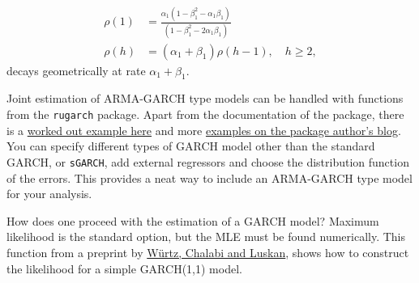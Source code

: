 \documentclass[]{book}
\begin{document}
\[
\begin{align}
  \rho(1) &= \frac{\alpha_1(1-\beta_1^2-\alpha_1\beta_1)}{(1-\beta_1^2-2\alpha_1\beta_1)} \\
  \rho(h) &= (\alpha_1+\beta_1)\rho(h-1), \quad h \geq 2,
\end{align}
\] decays geometrically at rate \(\alpha_1+\beta_1\).

Joint estimation of ARMA-GARCH type models can be handled with functions
from the \texttt{rugarch} package. Apart from the documentation of the
package, there is a
\href{http://unstarched.net/wp-content/uploads/2013/06/an-example-in-rugarch.pdf}{worked
out example here} and more
\href{http://unstarched.net/r-examples/rugarch/a-short-introduction-to-the-rugarch-package/}{examples
on the package author's blog}. You can specify different types of GARCH
model other than the standard GARCH, or \texttt{sGARCH}, add external
regressors and choose the distribution function of the errors. This
provides a neat way to include an ARMA-GARCH type model for your
analysis.

How does one proceed with the estimation of a GARCH model? Maximum
likelihood is the standard option, but the MLE must be found
numerically. This function from a preprint by
\href{http://www-stat.wharton.upenn.edu/~steele/Courses/956/RResources/GarchAndR/WurtzEtAlGarch.pdf}{Würtz,
Chalabi and Luskan}, shows how to construct the likelihood for a simple
GARCH(1,1) model.
\end{document}
